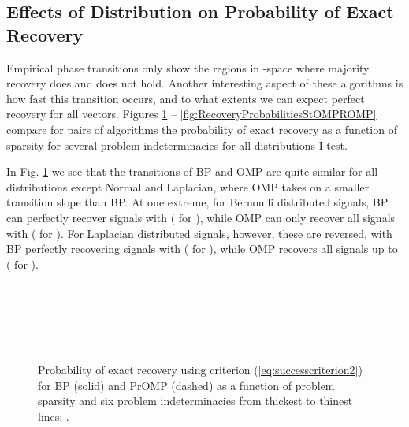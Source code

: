\documentclass[11pt,draftcls,onecolumn]{IEEEtran}
\begin{document}
\subsection{Effects of Distribution on Probability of Exact Recovery}
Empirical phase transitions only show the regions in -space 
where majority recovery does and does not hold.
Another interesting aspect of these algorithms is how fast this transition occurs,
and to what extents we can expect perfect recovery for all vectors.
Figures \ref{fig:RecoveryProbabilitiesBPPrOMP} -- \ref{fig:RecoveryProbabilitiesStOMPROMP}
compare for pairs of algorithms the probability of exact recovery
as a function of sparsity for several problem indeterminacies
for all distributions I test.

In Fig. \ref{fig:RecoveryProbabilitiesBPPrOMP} we see that the transitions of BP and OMP
are quite similar for all distributions except Normal and Laplacian, 
where OMP takes on a smaller transition slope than BP.
At one extreme, for Bernoulli distributed signals,
BP can perfectly recover signals with  ( for ),
while OMP can only recover all signals with  ( for ).
For Laplacian distributed signals, however,
these are reversed, with BP perfectly recovering signals with  ( for ),
while OMP recovers all signals up to  ( for ).

\begin{figure}[htb]
\centering
{}\hspace{-0.1in}
\\ \vspace{-0.1in}

\hspace{-0.1in}
\\ \vspace{-0.1in}

\hspace{-0.1in}
\\ \vspace{-0.1in}

\caption{Probability of exact recovery using criterion (\ref{eq:successcriterion2}) 
for BP (solid) and PrOMP (dashed) as a function of problem sparsity
and six problem indeterminacies from thickest to thinest lines: 
.}
\label{fig:RecoveryProbabilitiesBPPrOMP}
\end{figure}
\end{document}
